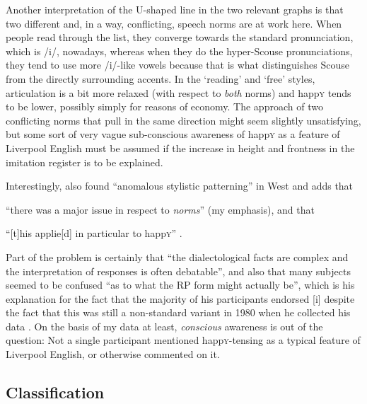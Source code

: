 Another interpretation of the U-shaped line in the two relevant graphs is that two different and, in a way, conflicting, speech norms are at work here.
When people read through the list, they converge towards the standard pronunciation, which is /i/, nowadays, whereas when they do the hyper-Scouse pronunciations, they tend to use more /i/-like vowels because that is what distinguishes Scouse from the directly surrounding accents.
In the `reading' and `free' styles, articulation is a bit more relaxed (with respect to \emph{both} norms) and happ\textsc{y} tends to be lower, possibly simply for reasons of economy.
The approach of two conflicting norms that pull in the same direction might seem slightly unsatisfying, but some sort of very vague sub-conscious awareness of happ\textsc{y} as a feature of Liverpool English must be assumed if the increase in height and frontness in the imitation register is to be explained.

Interestingly, \textcite[102]{newbrook1999} also found ``anomalous stylistic patterning'' in West  and adds that 
\begin{inparaenum}[(a)]
	\item ``there was a major issue in respect to \emph{norms}'' (my emphasis), and that
	\item ``[t]his applie[d] in particular to happ\textsc{y}'' \parencite[102]{newbrook1999}.
\end{inparaenum}
Part of the problem is certainly that ``the dialectological facts are complex and the interpretation of responses is often debatable'', and also that many subjects seemed to be confused ``as to what the RP form might actually be'', which is his explanation for the fact that the majority of his participants endorsed [i] despite the fact that this was still a non-standard variant in 1980 when he collected his data \parencite[101]{newbrook1999}.
On the basis of my data at least, \emph{conscious} awareness is out of the question: Not a single participant mentioned happ\textsc{y}-tensing as a typical feature of Liverpool English, or otherwise commented on it.

\subsection{Classification}
\label{prod.disc.happy.classification}

